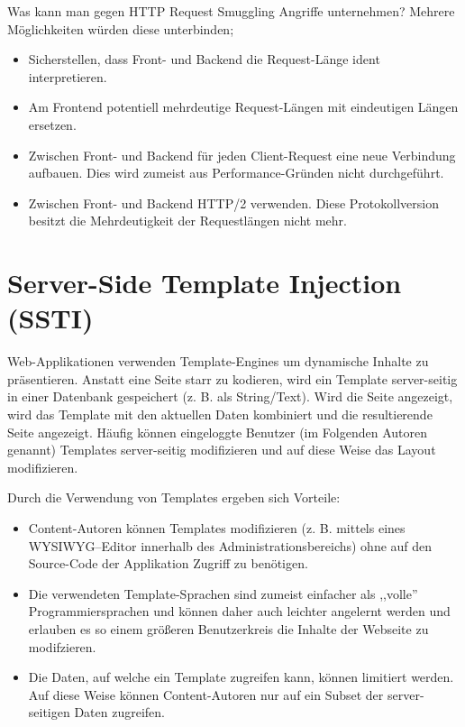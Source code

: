 Was kann man gegen HTTP Request Smuggling Angriffe unternehmen? Mehrere Möglichkeiten würden diese unterbinden;

\begin{itemize}
	\item Sicherstellen, dass Front- und Backend die Request-Länge ident interpretieren.
	\item Am Frontend potentiell mehrdeutige Request-Längen mit eindeutigen Längen ersetzen.
	\item Zwischen Front- und Backend für jeden Client-Request eine neue Verbindung aufbauen. Dies wird zumeist aus Performance-Gründen nicht durchgeführt.
	\item Zwischen Front- und Backend HTTP/2 verwenden. Diese Protokollversion besitzt die Mehrdeutigkeit der Requestlängen nicht mehr.
\end{itemize}

\section{Server-Side Template Injection (SSTI)}

Web-Applikationen verwenden Template-Engines um dynamische Inhalte zu präsentieren. Anstatt eine Seite starr zu kodieren, wird ein Template server-seitig in einer Datenbank gespeichert (z. B. als String/Text). Wird die Seite angezeigt, wird das Template mit den aktuellen Daten kombiniert und die resultierende Seite angezeigt. Häufig können eingeloggte Benutzer (im Folgenden  Autoren genannt) Templates server-seitig modifizieren und auf diese Weise das Layout modifizieren.

Durch die Verwendung von Templates ergeben sich Vorteile:

\begin{itemize}
	\item Content-Autoren können Templates modifizieren (z. B. mittels eines WYSIWYG--Editor innerhalb des Administrationsbereichs) ohne auf den Source-Code der Applikation Zugriff zu benötigen.
	\item Die verwendeten Template-Sprachen sind zumeist einfacher als ,,volle'' Programmiersprachen und können daher auch leichter angelernt werden und erlauben es so einem größeren Benutzerkreis die Inhalte der Webseite zu modifzieren.
	\item Die Daten, auf welche ein Template zugreifen kann, können limitiert werden. Auf diese Weise können Content-Autoren nur auf ein Subset der server-seitigen Daten zugreifen.
\end{itemize}

